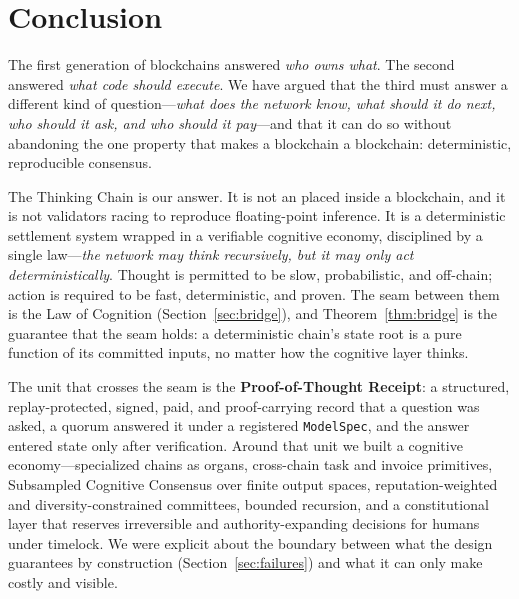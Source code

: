 \section{Conclusion}
\label{sec:conclusion}

The first generation of blockchains answered \emph{who owns what}. The second answered \emph{what code should execute}. We have argued that the third must answer a different kind of question---\emph{what does the network know, what should it do next, who should it ask, and who should it pay}---and that it can do so without abandoning the one property that makes a blockchain a blockchain: deterministic, reproducible consensus.

The Thinking Chain is our answer. It is not an \LLM{} placed inside a blockchain, and it is not validators racing to reproduce floating-point inference. It is a deterministic settlement system wrapped in a verifiable cognitive economy, disciplined by a single law---\emph{the network may think recursively, but it may only act deterministically}. Thought is permitted to be slow, probabilistic, and off-chain; action is required to be fast, deterministic, and proven. The seam between them is the Law of Cognition (Section~\ref{sec:bridge}), and Theorem~\ref{thm:bridge} is the guarantee that the seam holds: a deterministic chain's state root is a pure function of its committed inputs, no matter how the cognitive layer thinks.

The unit that crosses the seam is the \textbf{Proof-of-Thought Receipt}: a structured, replay-protected, signed, paid, and proof-carrying record that a question was asked, a quorum answered it under a registered \texttt{ModelSpec}, and the answer entered state only after verification. Around that unit we built a cognitive economy---specialized chains as organs, cross-chain task and invoice primitives, Subsampled Cognitive Consensus over finite output spaces, reputation-weighted and diversity-constrained committees, bounded recursion, and a constitutional layer that reserves irreversible and authority-expanding decisions for humans under timelock. We were explicit about the boundary between what the design guarantees by construction (Section~\ref{sec:failures}) and what it can only make costly and visible.

